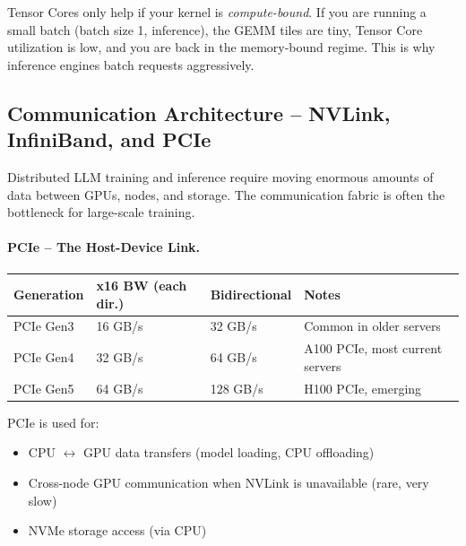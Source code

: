 \begin{warningbox}
Tensor Cores only help if your kernel is \emph{compute-bound}. If you are running a small batch (batch size 1, inference), the GEMM tiles are tiny, Tensor Core utilization is low, and you are back in the memory-bound regime. This is why inference engines batch requests aggressively.
\end{warningbox}

\subsection{Communication Architecture -- NVLink, InfiniBand, and PCIe}
\label{communication-architecture-nvlink-infiniband-and-pcie}

Distributed LLM training and inference require moving enormous amounts of data between GPUs, nodes, and storage. The communication fabric is often the bottleneck for large-scale training.

\paragraph{PCIe -- The Host-Device Link.}
\label{pcie-the-host-device-link.}

\begin{keybox}
\begin{tabular}{@{}lp{3.5cm}p{3.5cm}p{6cm}@{}}
\toprule
\textbf{Generation} & \textbf{x16 BW (each dir.)} & \textbf{Bidirectional} & \textbf{Notes} \\
\midrule
PCIe Gen3 & 16 GB/s & 32 GB/s & Common in older servers \\
PCIe Gen4 & 32 GB/s & 64 GB/s & A100 PCIe, most current servers \\
PCIe Gen5 & 64 GB/s & 128 GB/s & H100 PCIe, emerging \\
\bottomrule
\end{tabular}
\end{keybox}

PCIe is used for:

\begin{itemize}
  \item CPU $\leftrightarrow$ GPU data transfers (model loading, CPU offloading)
  \item Cross-node GPU communication when NVLink is unavailable (rare, very slow)
  \item NVMe storage access (via CPU)
\end{itemize}

